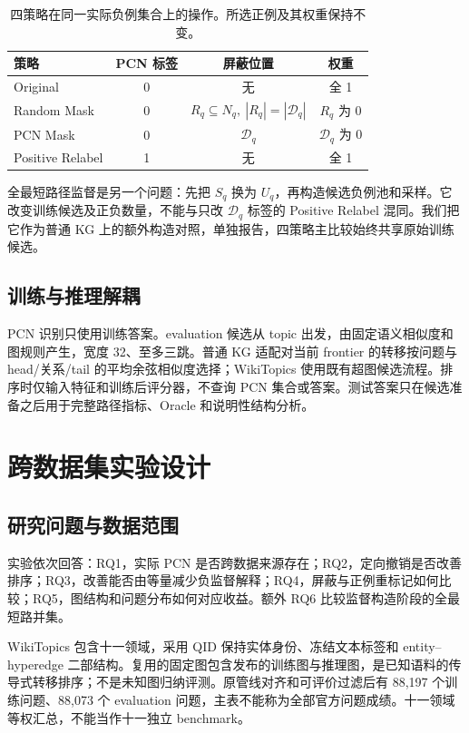 \documentclass[UTF8,a4paper,10pt,fontset=fandol]{ctexart}
\newcommand{\pcn}{\mathcal D_q}
\begin{document}
\begin{table}[tbp]\centering
\caption{四策略在同一实际负例集合上的操作。所选正例及其权重保持不变。}\label{tab:strategies}
\begin{tabular}{lccc}\toprule
策略 & PCN 标签 & 屏蔽位置 & 权重 \\\midrule
Original & 0 & 无 & 全 1 \\
Random Mask & 0 & $R_q\subseteq N_q,\ |R_q|=|\pcn|$ & $R_q$ 为 0 \\
PCN Mask & 0 & $\pcn$ & $\pcn$ 为 0 \\
Positive Relabel & 1 & 无 & 全 1 \\\bottomrule
\end{tabular}
\end{table}

全最短路径监督是另一个问题：先把 $S_q$ 换为 $U_q$，再构造候选负例池和采样。它改变训练候选及正负数量，不能与只改 $\pcn$ 标签的 Positive Relabel 混同。我们把它作为普通 KG 上的额外构造对照，单独报告，四策略主比较始终共享原始训练候选。

\subsection{训练与推理解耦}
PCN 识别只使用训练答案。evaluation 候选从 topic 出发，由固定语义相似度和图规则产生，宽度 32、至多三跳。普通 KG 适配对当前 frontier 的转移按问题与 head/关系/tail 的平均余弦相似度选择；WikiTopics 使用既有超图候选流程。排序时仅输入特征和训练后评分器，不查询 PCN 集合或答案。测试答案只在候选准备之后用于完整路径指标、Oracle 和说明性结构分析。

\section{跨数据集实验设计}
\subsection{研究问题与数据范围}
实验依次回答：RQ1，实际 PCN 是否跨数据来源存在；RQ2，定向撤销是否改善排序；RQ3，改善能否由等量减少负监督解释；RQ4，屏蔽与正例重标记如何比较；RQ5，图结构和问题分布如何对应收益。额外 RQ6 比较监督构造阶段的全最短路并集。

WikiTopics 包含十一领域，采用 QID 保持实体身份、冻结文本标签和 entity--hyperedge 二部结构\cite{hyperrag}。复用的固定图包含发布的训练图与推理图，是已知语料的传导式转移排序；不是未知图归纳评测。原管线对齐和可评价过滤后有 88,197 个训练问题、88,073 个 evaluation 问题，主表不能称为全部官方问题成绩。十一领域等权汇总，不能当作十一独立 benchmark。
\end{document}
